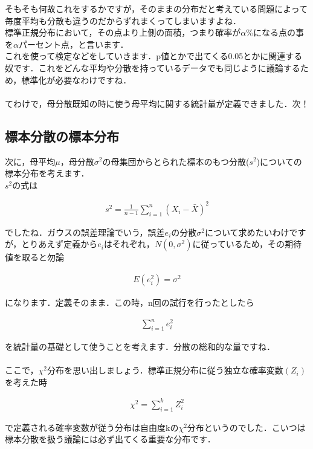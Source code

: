 \documentclass[11pt,a4paper]{ujreport} 	%
\begin{document}
そもそも何故これをするかですが，そのままの分布だと考えている問題によって毎度平均も分散も違うのだからずれまくってしまいますよね．\\

標準正規分布において，その点より上側の面積，つまり確率が$\alpha$\%になる点の事を$\alpha$パーセント点，と言います．\\

これを使って検定などをしていきます．p値とかで出てくる0.05とかに関連する奴です．これをどんな平均や分散を持っているデータでも同じように議論するため，標準化が必要なわけですね．\\
\\

てわけで，母分散既知の時に使う母平均に関する統計量が定義できました．次！
\subsection{標本分散の標本分布}
次に，母平均$\mu$，母分散$\sigma^2$の母集団からとられた標本のもつ分散($s^2$)についての標本分布を考えます．\\

$s^2$の式は

\begin{align}
  s^2 = \frac{1}{n-1}\sum_{i=1}^n (X_i - \bar{X})^2
\end{align}

でしたね．ガウスの誤差理論でいう，誤差$e_i$の分散$\sigma^2$について求めたいわけですが，とりあえず定義から$e_i$はそれぞれ，$N(0,\sigma^2)$に従っているため，その期待値を取ると勿論

\begin{align}
  E(e_i^2) = \sigma^2
\end{align}

になります．定義そのまま．この時，n回の試行を行ったとしたら

\begin{align}
  \sum_{i=1}^n e_i^2
\end{align}

を統計量の基礎として使うことを考えます．分散の総和的な量ですね．\\
\\


ここで，$\chi^2$分布を思い出しましょう．標準正規分布に従う独立な確率変数$(Z_i)$を考えた時

\begin{align}
  \chi^2 = \sum_{i=1}^k Z_i^2
\end{align}

で定義される確率変数が従う分布は自由度kの$\chi^2$分布というのでした．こいつは標本分散を扱う議論には必ず出てくる重要な分布です．\\
\end{document}
